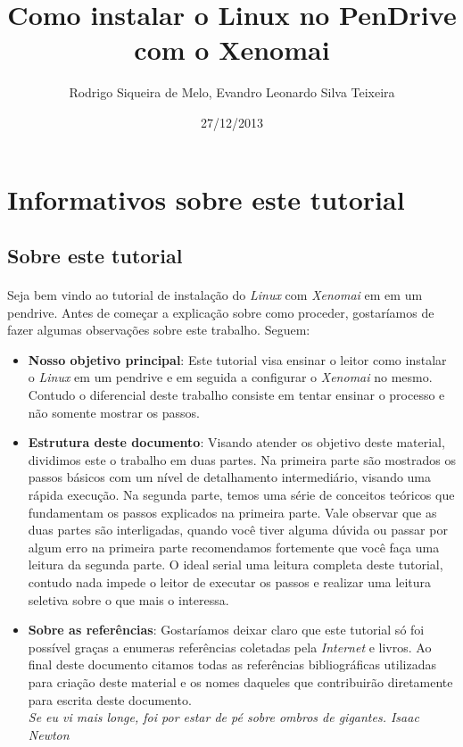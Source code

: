 \documentclass[a4paper,10pt]{article}
\title{Como instalar o Linux no PenDrive com o Xenomai}
\author{Rodrigo Siqueira de Melo, Evandro Leonardo Silva Teixeira}
\date{27/12/2013}
\begin{document}
    \maketitle
    \titlepage
    \tableofcontents

\newpage
\section{Informativos sobre este tutorial}
  \subsection{Sobre este tutorial}
    \paragraph{}
    Seja bem vindo ao tutorial de instalação do \emph{Linux} com \emph{Xenomai} em em um pendrive. Antes de 
    começar a explicação sobre como proceder, gostaríamos de fazer algumas observações sobre este trabalho. 
    Seguem:
      \begin{itemize}
	\item \textbf{Nosso objetivo principal}: Este tutorial visa ensinar o leitor como instalar o 
	      \emph{Linux} em um pendrive e em seguida a configurar o \emph{Xenomai} no mesmo. Contudo o 
	      diferencial deste trabalho consiste em tentar ensinar o processo e não somente mostrar os 
	      passos. 
	\item \textbf{Estrutura deste documento}: Visando atender os objetivo deste material, dividimos este 
	      o trabalho em duas partes. Na primeira parte são mostrados os passos básicos com um nível de 
	      detalhamento intermediário, visando uma rápida execução. Na segunda parte, temos uma série de 
	      conceitos teóricos que fundamentam os passos explicados na primeira parte. Vale observar que as 
	      duas partes são interligadas, quando você tiver alguma dúvida ou passar por algum erro na primeira 
	      parte recomendamos fortemente que você faça uma leitura da segunda parte. O ideal serial uma 
	      leitura completa deste tutorial, contudo nada impede o leitor de executar os passos e realizar 
	      uma leitura seletiva sobre o que mais o interessa.
	\item \textbf{Sobre as referências}: Gostaríamos deixar claro que este tutorial só foi possível graças 
	      a enumeras referências coletadas pela \emph{Internet} e livros. Ao final deste documento citamos 
	      todas as referências bibliográficas utilizadas para criação deste material e os nomes daqueles que 
	      contribuirão diretamente para escrita deste documento. \\
	      \emph{Se eu vi mais longe, foi por estar de pé sobre ombros de gigantes. Isaac Newton}
      \end{itemize}
\end{document}
